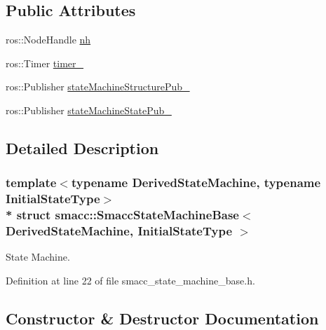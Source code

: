 \subsection*{Public Attributes}
\begin{DoxyCompactItemize}
\item 
ros\+::\+Node\+Handle \hyperlink{structsmacc_1_1SmaccStateMachineBase_a191b29227e32c440c936ac05359e9cd5}{nh}
\item 
ros\+::\+Timer \hyperlink{structsmacc_1_1SmaccStateMachineBase_a7fc7227a0c6321cf7253683a1f38c4f8}{timer\+\_\+}
\item 
ros\+::\+Publisher \hyperlink{structsmacc_1_1SmaccStateMachineBase_af586b32d0f79caba26c2dbca76a55767}{state\+Machine\+Structure\+Pub\+\_\+}
\item 
ros\+::\+Publisher \hyperlink{structsmacc_1_1SmaccStateMachineBase_a7c76e7a7d6c00d9831472297ff51e38c}{state\+Machine\+State\+Pub\+\_\+}
\end{DoxyCompactItemize}


\subsection{Detailed Description}
\subsubsection*{template$<$typename Derived\+State\+Machine, typename Initial\+State\+Type$>$\\*
struct smacc\+::\+Smacc\+State\+Machine\+Base$<$ Derived\+State\+Machine, Initial\+State\+Type $>$}

State Machine. 

Definition at line 22 of file smacc\+\_\+state\+\_\+machine\+\_\+base.\+h.



\subsection{Constructor \& Destructor Documentation}
